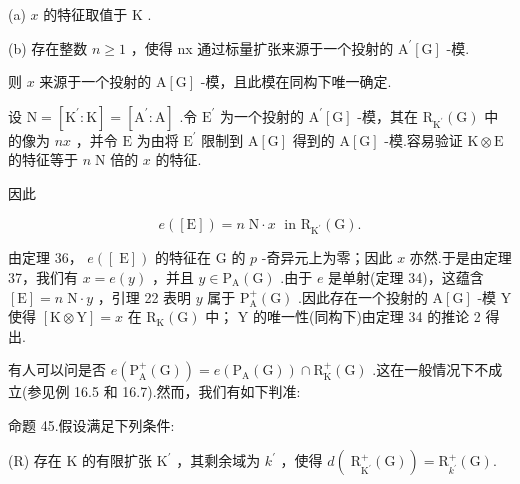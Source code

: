 \documentclass[10pt]{article}
\begin{document}
(a) \(x\) 的特征取值于 \(\mathrm{K}\) .

(b) 存在整数 \(n \geq  1\) ，使得 nx 通过标量扩张来源于一个投射的 \({\mathrm{A}}^{\prime }\left\lbrack  \mathrm{G}\right\rbrack\) -模.

则 \(x\) 来源于一个投射的 \(\mathrm{A}\left\lbrack  \mathrm{G}\right\rbrack\) -模，且此模在同构下唯一确定.

设 \(\mathrm{N} = \left\lbrack  {{\mathrm{K}}^{\prime } : \mathrm{K}}\right\rbrack   = \left\lbrack  {{\mathrm{A}}^{\prime } : \mathrm{A}}\right\rbrack\) .令 \({\mathrm{E}}^{\prime }\) 为一个投射的 \({\mathrm{A}}^{\prime }\left\lbrack  \mathrm{G}\right\rbrack\) -模，其在 \({\mathrm{R}}_{{\mathrm{K}}^{\prime }}\left( \mathrm{G}\right)\) 中的像为 \({nx}\) ，并令 \(\mathrm{E}\) 为由将 \({\mathrm{E}}^{\prime }\) 限制到 \(\mathrm{A}\left\lbrack  \mathrm{G}\right\rbrack\) 得到的 \(\mathrm{A}\left\lbrack  \mathrm{G}\right\rbrack\) -模.容易验证 \(\mathrm{K} \otimes  \mathrm{E}\) 的特征等于 \(n\mathrm{\;N}\) 倍的 \(x\) 的特征.

因此

\[
e\left( \left\lbrack  \mathrm{E}\right\rbrack  \right)  = n\mathrm{\;N} \cdot  x\;\text{ in }{\mathrm{R}}_{{\mathrm{K}}^{\prime }}\left( \mathrm{G}\right) .
\]

由定理 36， \(e\left( \left\lbrack  \mathrm{\;E}\right\rbrack  \right)\) 的特征在 \(\mathrm{G}\) 的 \(p\) -奇异元上为零；因此 \(x\) 亦然.于是由定理 37，我们有 \(x = e\left( y\right)\) ，并且 \(y \in  {\mathrm{P}}_{\mathrm{A}}\left( \mathrm{G}\right)\) .由于 \(e\) 是单射(定理 34)，这蕴含 \(\left\lbrack  \mathrm{E}\right\rbrack   = n\mathrm{\;N} \cdot  y\) ，引理 22 表明 \(y\) 属于 \({\mathrm{P}}_{\mathrm{A}}^{ + }\left( \mathrm{G}\right)\) .因此存在一个投射的 \(\mathrm{A}\left\lbrack  \mathrm{G}\right\rbrack\) -模 \(\mathrm{Y}\) 使得 \(\left\lbrack  {\mathrm{K} \otimes  \mathrm{Y}}\right\rbrack   = x\) 在 \({\mathrm{R}}_{\mathrm{K}}\left( \mathrm{G}\right)\) 中； \(\mathrm{Y}\) 的唯一性(同构下)由定理 34 的推论 2 得出.

有人可以问是否 \(e\left( {{\mathrm{P}}_{\mathrm{A}}^{ + }\left( \mathrm{G}\right) }\right)  = e\left( {{\mathrm{P}}_{\mathrm{A}}\left( \mathrm{G}\right) }\right)  \cap  {\mathrm{R}}_{\mathrm{K}}^{ + }\left( \mathrm{G}\right)\) .这在一般情况下不成立(参见例 16.5 和 16.7).然而，我们有如下判准:

命题 45.假设满足下列条件:

(R) 存在 \(\mathrm{K}\) 的有限扩张 \({\mathrm{K}}^{\prime }\) ，其剩余域为 \({k}^{\prime }\) ，使得 \(d\left( {{\mathrm{\;R}}_{{\mathrm{K}}^{\prime }}^{ + }\left( \mathrm{G}\right) }\right)  = {\mathrm{R}}_{{k}^{\prime }}^{ + }\left( \mathrm{G}\right) .\)
\end{document}
